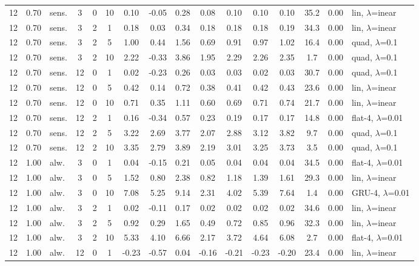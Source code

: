 \documentclass[10pt]{article}
\begin{document}
\begin{scriptsize}
\begin{longtable}{cclcc c ccc ccc c cc l}
12 & 0.70 & sens. & 3 & 0 & 10 & 0.10 & -0.05 & 0.28 & 0.08 & 0.10 & 0.10 & 0.10 & 35.2 & 0.00 & lin, $\lambda$=inear \\
12 & 0.70 & sens. & 3 & 2 & 1 & 0.18 & 0.03 & 0.34 & 0.18 & 0.18 & 0.18 & 0.19 & 34.3 & 0.00 & lin, $\lambda$=inear \\
12 & 0.70 & sens. & 3 & 2 & 5 & 1.00 & 0.44 & 1.56 & 0.69 & 0.91 & 0.97 & 1.02 & 16.4 & 0.00 & quad, $\lambda$=0.1 \\
12 & 0.70 & sens. & 3 & 2 & 10 & 2.22 & -0.33 & 3.86 & 1.95 & 2.29 & 2.26 & 2.35 & 1.7 & 0.00 & quad, $\lambda$=0.1 \\
12 & 0.70 & sens. & 12 & 0 & 1 & 0.02 & -0.23 & 0.26 & 0.03 & 0.03 & 0.02 & 0.03 & 30.7 & 0.00 & quad, $\lambda$=0.1 \\
12 & 0.70 & sens. & 12 & 0 & 5 & 0.42 & 0.14 & 0.72 & 0.38 & 0.41 & 0.42 & 0.43 & 23.6 & 0.00 & lin, $\lambda$=inear \\
12 & 0.70 & sens. & 12 & 0 & 10 & 0.71 & 0.35 & 1.11 & 0.60 & 0.69 & 0.71 & 0.74 & 21.7 & 0.00 & lin, $\lambda$=inear \\
12 & 0.70 & sens. & 12 & 2 & 1 & 0.16 & -0.34 & 0.57 & 0.23 & 0.19 & 0.17 & 0.17 & 14.8 & 0.00 & flat-4, $\lambda$=0.01 \\
12 & 0.70 & sens. & 12 & 2 & 5 & 3.22 & 2.69 & 3.77 & 2.07 & 2.88 & 3.12 & 3.82 & 9.7 & 0.00 & quad, $\lambda$=0.1 \\
12 & 0.70 & sens. & 12 & 2 & 10 & 3.35 & 2.79 & 3.89 & 2.19 & 3.01 & 3.25 & 3.73 & 3.5 & 0.00 & quad, $\lambda$=0.1 \\
12 & 1.00 & alw. & 3 & 0 & 1 & 0.04 & -0.15 & 0.21 & 0.05 & 0.04 & 0.04 & 0.04 & 34.5 & 0.00 & flat-4, $\lambda$=0.01 \\
12 & 1.00 & alw. & 3 & 0 & 5 & 1.52 & 0.80 & 2.38 & 0.82 & 1.18 & 1.39 & 1.61 & 29.3 & 0.00 & lin, $\lambda$=inear \\
12 & 1.00 & alw. & 3 & 0 & 10 & 7.08 & 5.25 & 9.14 & 2.31 & 4.02 & 5.39 & 7.64 & 1.4 & 0.00 & GRU-4, $\lambda$=0.01 \\
12 & 1.00 & alw. & 3 & 2 & 1 & 0.02 & -0.11 & 0.17 & 0.02 & 0.02 & 0.02 & 0.02 & 34.6 & 0.00 & lin, $\lambda$=inear \\
12 & 1.00 & alw. & 3 & 2 & 5 & 0.92 & 0.29 & 1.65 & 0.49 & 0.72 & 0.85 & 0.96 & 32.3 & 0.00 & lin, $\lambda$=inear \\
12 & 1.00 & alw. & 3 & 2 & 10 & 5.33 & 4.10 & 6.66 & 2.17 & 3.72 & 4.64 & 6.08 & 2.7 & 0.00 & flat-4, $\lambda$=0.01 \\
12 & 1.00 & alw. & 12 & 0 & 1 & -0.23 & -0.57 & 0.04 & -0.16 & -0.21 & -0.23 & -0.20 & 23.4 & 0.00 & lin, $\lambda$=inear \\

\end{longtable}
\end{scriptsize}
\end{document}
